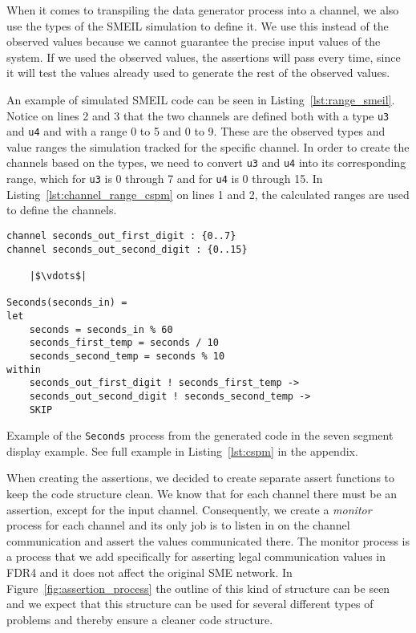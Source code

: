 When it comes to transpiling the data generator process into a \cspm{} channel, we also use the types of the SMEIL simulation to define it. We use this instead of the observed values because we cannot guarantee the precise input values of the system. If we used the observed values, the assertions will pass every time, since it will test the values already used to generate the rest of the observed values.

An example of simulated SMEIL code can be seen in Listing~\ref{lst:range_smeil}. Notice on lines 2 and 3 that the two channels are defined both with a type \texttt{u3} and \texttt{u4} and with a range 0 to 5 and 0 to 9. These are the observed types and value ranges the simulation tracked for the specific channel. In order to create the \cspm{} channels based on the types, we need to convert \texttt{u3} and \texttt{u4} into its corresponding range, which for \texttt{u3} is 0 through 7 and for \texttt{u4} is 0 through 15. In Listing~\ref{lst:channel_range_cspm} on lines 1 and 2, the calculated ranges are used to define the \cspm{} channels.

\begin{listing}
\begin{verbatim}
channel seconds_out_first_digit : {0..7}
channel seconds_out_second_digit : {0..15}

    |$\vdots$|

Seconds(seconds_in) =
let
    seconds = seconds_in % 60
    seconds_first_temp = seconds / 10
    seconds_second_temp = seconds % 10
within
    seconds_out_first_digit ! seconds_first_temp ->
    seconds_out_second_digit ! seconds_second_temp ->
    SKIP
\end{verbatim}
\caption{Example of the \texttt{Seconds} process from the generated \cspm{} code in the seven segment display example. See full example in Listing~\ref{lst:cspm} in the appendix.}
\label{lst:channel_range_cspm}
\end{listing}

When creating the assertions, we decided to create separate assert functions to keep the code structure clean. We know that for each \cspm{} channel there must be an assertion, except for the input channel.
Consequently, we create a \textit{monitor} process for each channel and its only job is to listen in on the channel communication and assert the values communicated there. The monitor process is a process that we add specifically for asserting legal communication values in FDR4 and it does not affect the original SME network.
In Figure~\ref{fig:assertion_process} the outline of this kind of structure can be seen and we expect that this structure can be used for several different types of problems and thereby ensure a cleaner code structure.

